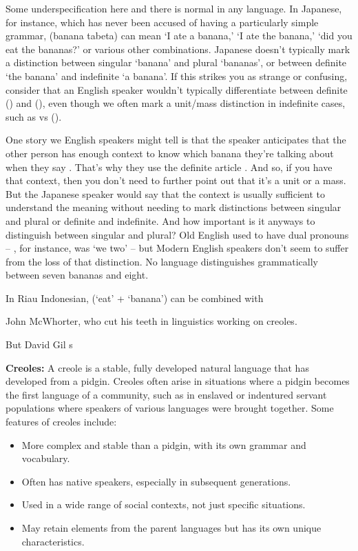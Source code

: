 Some underspecification here and there is normal in any language. In Japanese, for instance, which has never been accused of having a particularly simple grammar,  (banana tabeta) can mean `I ate a banana,' `I ate the banana,' `did you eat the bananas?' or various other combinations. Japanese doesn't typically mark a distinction between singular `banana' and plural `bananas', or between definite `the banana' and indefinite `a banana'. If this strikes you as strange or confusing, consider that an English speaker wouldn't typically differentiate between definite  ()  and  (), even though we often mark a unit/mass distinction in indefinite cases, such as  vs  ().

One story we English speakers might tell is that the speaker anticipates that the other person has enough context to know which banana they're talking about when they say . That's why they use the definite article . And so, if you have that context, then you don't need to further point out that it's a unit or a mass. But the Japanese speaker would say that the context is usually sufficient to understand the meaning without needing to mark distinctions between singular and plural or definite and indefinite. And how important is it anyways to distinguish between singular and plural? Old English used to have dual pronouns -- , for instance, was `we two' -- but Modern English speakers don't seem to suffer from the loss of that distinction. No language distinguishes grammatically between seven bananas and eight.

In Riau Indonesian,  (`eat' + `banana') can be combined with 

John McWhorter, who cut his teeth in linguistics working on creoles. 

But David Gil s


\textbf{Creoles:}
A creole is a stable, fully developed natural language that has developed from a pidgin. Creoles often arise in situations where a pidgin becomes the first language of a community, such as in enslaved or indentured servant populations where speakers of various languages were brought together. Some features of creoles include:
\begin{itemize}
    \item More complex and stable than a pidgin, with its own grammar and vocabulary.
    \item Often has native speakers, especially in subsequent generations.
    \item Used in a wide range of social contexts, not just specific situations.
    \item May retain elements from the parent languages but has its own unique characteristics.
\end{itemize}





